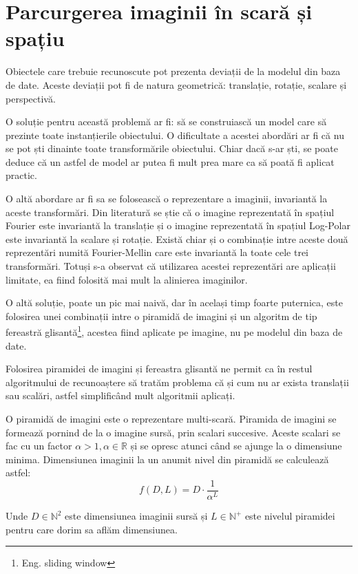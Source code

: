 \pagebreak
\section{Parcurgerea imaginii în scară și spațiu}

Obiectele care trebuie recunoscute pot prezenta deviații de la modelul din baza de date.
Aceste deviații pot fi de natura geometrică: translație, rotație, scalare și perspectivă.

O soluție pentru această problemă ar fi: să se construiască un model care să prezinte toate instanțierile obiectului.
O dificultate a acestei abordări ar fi că nu se pot ști dinainte toate transformările obiectului.
Chiar dacă s-ar ști, se poate deduce că un astfel de model ar putea fi mult prea mare ca să poată fi aplicat practic.

O altă abordare ar fi sa se folosească o reprezentare a imaginii, invariantă la aceste transformări.
Din literatură se știe că o imagine reprezentată în spațiul Fourier este invariantă la translație și o imagine reprezentată în spațiul Log-Polar este invariantă la scalare și rotație\cite{treiber2010introduction}.
Există chiar și o combinație intre aceste două reprezentări numită Fourier-Mellin care este invariantă la toate cele trei transformări.
Totuși s-a observat că utilizarea acestei reprezentări are aplicații limitate, ea fiind folosită mai mult la alinierea imaginilor\cite{treiber2010introduction}.

O altă soluție, poate un pic mai naivă, dar în același timp foarte puternica, este folosirea unei combinații intre o piramidă de imagini și un algoritm de tip fereastră glisantă\footnote{Eng. sliding window}, acestea fiind aplicate pe imagine, nu pe modelul din baza de date.

Folosirea piramidei de imagini și fereastra glisantă ne permit ca în restul algoritmului de recunoaștere să tratăm problema că și cum nu ar exista translații sau scalări, astfel simplificând mult algoritmii aplicați.

O piramidă de imagini este o reprezentare multi-scară.
Piramida de imagini se formează pornind de la o imagine sursă, prin scalari succesive.
Aceste scalari se fac cu un factor ${\alpha > 1, \alpha \in \mathbb{R}}$ și se opresc atunci când se ajunge la o dimensiune minima.
Dimensiunea imaginii la un anumit nivel din piramidă se calculează astfel:
$${
f(D,L) = D \cdot \frac{1}{\alpha^L}
}$$

Unde ${D \in \mathbb{N}^2}$ este dimensiunea imaginii sursă și ${L \in \mathbb{N}^+}$ este nivelul piramidei pentru care dorim sa aflăm dimensiunea.

